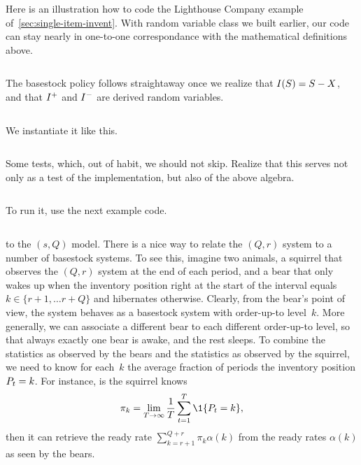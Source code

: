 \documentclass[queueing-book.tex]{subfiles}
\begin{document}
Here is an illustration how to code the Lighthouse Company example of~\cref{sec:single-item-invent}.
With random variable class we built earlier, our code can stay nearly in one-to-one correspondance with the mathematical definitions above.
\inputminted[firstline=2, lastline=5]{python}{../code/lighthouse.py} %

The basestock policy follows straightaway once we realize that $I(S) = S - X$, and that $I^{+}$ and $I^{-}$ are derived random variables.
\inputminted[firstline=11, lastline=43]{python}{../code/lighthouse.py} %
We instantiate it like this.
\inputminted[firstline=50, lastline=58]{python}{../code/lighthouse.py} %
Some tests, which, out of habit, we should not skip. Realize that this serves not only as a test of the implementation, but also  of the above algebra.
\inputminted[firstline=62, lastline=67]{python}{../code/lighthouse.py} %
To run it, use the next example code.
\inputminted[firstline=71, lastline=73]{python}{../code/lighthouse.py} %



 to the $(s, Q)$ model.
There is a nice way to relate the $(Q,r)$ system to a number of basestock systems.
To see this, imagine two animals, a squirrel that observes the $(Q,r)$ system at the end of each period, and a bear that only wakes up when the inventory position right at the start of the interval equals~$k \in \{r+1, \ldots r+Q\}$ and hibernates otherwise.
Clearly, from the bear's point of view, the system behaves as a basestock system with order-up-to level~$k$.
More generally, we can associate a different bear to each different order-up-to level, so that always exactly one bear is awake, and the rest sleeps.
To combine the statistics as observed by the bears and the statistics as observed by the squirrel, we need to know for each~$k$ the average fraction of periods the inventory position $P_{t} = k$.
For instance, is the squirrel  knows
\begin{equation*}
\pi_{k} = \lim_{T\to \infty} \frac{1}{T} \sum_{t=1}^{T}\1{\IP_t = k},
\end{equation*}
then it can retrieve the ready rate $\sum_{k=r+1}^{Q+r} \pi_k \alpha(k)$ from the ready rates $\alpha(k)$ as seen by the bears.
\end{document}

